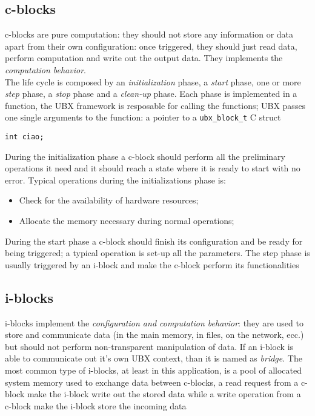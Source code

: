 \subsection{c-blocks}
c-blocks are pure computation: they should not store any information or data apart from their own configuration: once triggered, they should just read data, perform computation and write out the output data. They implements the \emph{computation behavior}.\\
The life cycle is composed by an \emph{initialization} phase, a \emph{start} phase, one or more \emph{step} phase, a \emph{stop} phase and a \emph{clean-up} phase. Each phase is implemented in a function, the UBX framework is resposable for calling the functions; UBX passes one single arguments to the function: a pointer to a \texttt{ubx\_block\_t} C struct
\begin{lstlisting}
int ciao;

\end{lstlisting}
During the initialization phase a c-block should perform all the preliminary operations it need and it should reach a state where it is ready to start with no error. Typical operations during the initializations phase is:
\begin{itemize}
	\item Check for the availability of hardware resources;
	\item Allocate the memory necessary during normal operations;
\end{itemize}
During the start phase a c-block should finish its configuration and be ready for being triggered; a typical operation is set-up all the parameters.
The step phase is usually triggered by an i-block and make the c-block perform its functionalities

\subsection{i-blocks}
i-blocks implement the \emph{configuration and computation behavior}: they are used to store and communicate data (in the main memory, in files, on the network, ecc.) but should not perform non-transparent manipulation of data. If an i-block is able to communicate out it's own UBX context, than it is named as \emph{bridge}.
The most common type of i-blocks, at least in this application, is a pool of allocated system memory used to exchange data between c-blocks, a read request from a c-block make the i-block write out the stored data while a write operation from a c-block make the i-block store the incoming data

